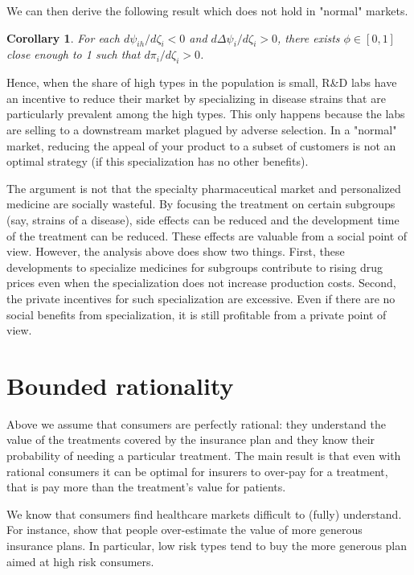 \documentclass[12pt,english,a4paper]{article}
\newtheorem{corollary}{Corollary}
\begin{document}
We can then derive the following result which does not hold in "normal" markets.

\begin{corollary}\label{cor:targeting}
For each $d\psi_{ih}/d\zeta_i<0$ and $d\Delta\psi_i/d\zeta_i>0$, there exists $\phi \in [0,1]$ close enough to 1 such that $d\pi_i/d\zeta_i>0$.
\end{corollary}

Hence, when the share of high types in the population is small, R\&D labs have an incentive to reduce their market by specializing in disease strains that are particularly prevalent among the high types. This only happens because the labs are selling to a downstream market plagued by adverse selection. In a "normal" market, reducing the appeal of your product to a subset of customers is not an optimal strategy (if this specialization has no other benefits).

The argument is not that the specialty pharmaceutical market and personalized medicine are socially wasteful. By focusing the treatment on certain subgroups (say, strains of a disease), side effects can be reduced and the development time of the treatment can be reduced. These effects are valuable from a social point of view. However, the analysis above does show two things. First, these developments to specialize medicines for subgroups contribute to rising drug prices even when the specialization does not increase production costs. Second, the private incentives for such specialization are excessive. Even if there are no social benefits from specialization, it is still profitable from a private point of view.


\section{Bounded rationality}
\label{sec:org52f7779}

Above we assume that consumers are perfectly rational: they understand the value of the treatments covered by the insurance plan and they know their probability of needing a particular treatment. The main result is that even with rational consumers it can be optimal for insurers to over-pay for a treatment, that is pay more than the treatment's value for patients.

We know that consumers find healthcare markets difficult to (fully) understand. For instance, \cite{handel-2015-healt-insur-human} show that people over-estimate the value of more generous insurance plans. In particular, low risk types tend to buy the more generous plan aimed at high risk consumers.
\end{document}
